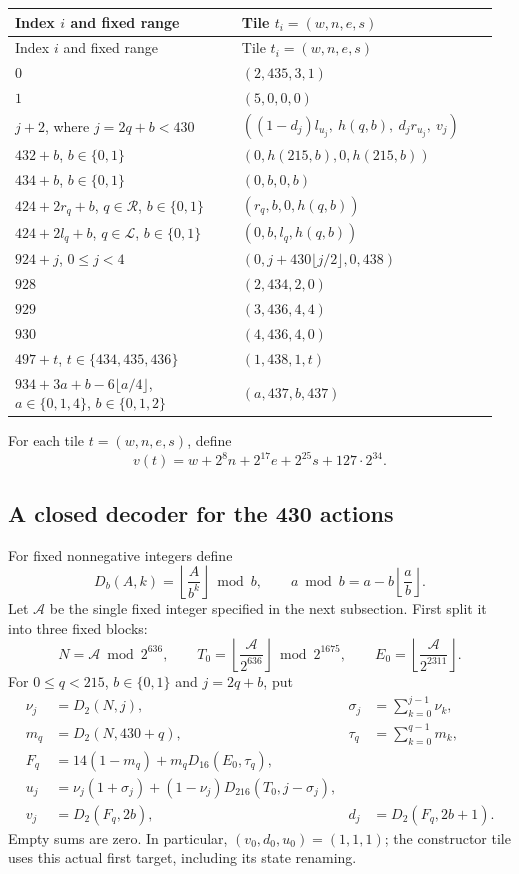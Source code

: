 \begingroup
\renewcommand{\arraystretch}{1.35}
\begin{longtable}{@{}p{0.45\linewidth}p{0.51\linewidth}@{}}
\toprule
Index $i$ and fixed range & Tile $t_i=(w,n,e,s)$\\
\midrule
\endfirsthead
\toprule
Index $i$ and fixed range & Tile $t_i=(w,n,e,s)$\\
\midrule
\endhead
$0$ & $(2,435,3,1)$\\
$1$ & $(5,0,0,0)$\\
$j+2$, where $j=2q+b<430$ &
 $((1-d_j)l_{u_j},\ h(q,b),\ d_jr_{u_j},\ v_j)$\\
$432+b$, $b\in\{0,1\}$ & $(0,h(215,b),0,h(215,b))$\\
$434+b$, $b\in\{0,1\}$ & $(0,b,0,b)$\\
$424+2r_q+b$, $q\in\mathcal R$, $b\in\{0,1\}$ &
 $(r_q,b,0,h(q,b))$\\
$424+2l_q+b$, $q\in\mathcal L$, $b\in\{0,1\}$ &
 $(0,b,l_q,h(q,b))$\\
$924+j$, $0\leq j<4$ &
 $(0,j+430\lfloor j/2\rfloor,0,438)$\\
$928$ & $(2,434,2,0)$\\
$929$ & $(3,436,4,4)$\\
$930$ & $(4,436,4,0)$\\
$497+t$, $t\in\{434,435,436\}$ & $(1,438,1,t)$\\
$934+3a+b-6\lfloor a/4\rfloor$,\newline
 $a\in\{0,1,4\}$, $b\in\{0,1,2\}$ & $(a,437,b,437)$\\
\bottomrule
\end{longtable}
\endgroup

For each tile $t=(w,n,e,s)$, define
\[
 v(t)=w+2^8n+2^{17}e+2^{25}s+127\cdot2^{34}.
\]

\subsection{A closed decoder for the 430 actions}

For fixed nonnegative integers define
\[
 D_b(A,k)=\left\lfloor\frac{A}{b^k}\right\rfloor\bmod b,
 \qquad
 a\bmod b=a-b\left\lfloor\frac{a}{b}\right\rfloor.
\]
Let $\mathcal A$ be the single fixed integer specified in the next
subsection.  First split it into three fixed blocks:
\[
 N=\mathcal A\bmod2^{636},\qquad
 T_0=\left\lfloor\frac{\mathcal A}{2^{636}}\right\rfloor
          \bmod2^{1675},\qquad
 E_0=\left\lfloor\frac{\mathcal A}{2^{2311}}\right\rfloor.
\]
For $0\leq q<215$, $b\in\{0,1\}$ and $j=2q+b$, put
\begin{align*}
 \nu_j&=D_2(N,j),
 &\sigma_j&=\sum_{k=0}^{j-1}\nu_k,\\
 m_q&=D_2(N,430+q),
 &\tau_q&=\sum_{k=0}^{q-1}m_k,\\
 F_q&=14(1-m_q)+m_qD_{16}(E_0,\tau_q),\\
 u_j&=\nu_j(1+\sigma_j)
              +(1-\nu_j)D_{216}(T_0,j-\sigma_j),\\
 v_j&=D_2(F_q,2b),
 &d_j&=D_2(F_q,2b+1).
\end{align*}
Empty sums are zero.  In particular,
$(v_0,d_0,u_0)=(1,1,1)$; the constructor tile uses this actual first
target, including its state renaming.

